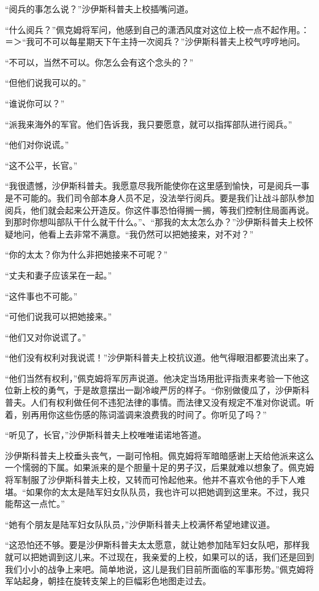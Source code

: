     “阅兵的事怎么说？”沙伊斯科普夫上校插嘴问道。

    “什么阅兵？”佩克姆将军问，他感到自己的潇洒风度对这位上校一点不起作用。：＝＞“我可不可以每星期天下午主持一次阅兵？”沙伊斯科普夫上校气哼哼地问。

    “不可以，当然不可以。你怎么会有这个念头的？”

    “但他们说我可以的。”

    “谁说你可以？”

    “派我来海外的军官。他们告诉我，我只要愿意，就可以指挥部队进行阅兵。”

    “他们对你说谎。”

    “这不公平，长官。”

    “我很遗憾，沙伊斯科普夫。我愿意尽我所能使你在这里感到愉快，可是阅兵一事是不可能的。我们司令部本身人员不足，没法举行阅兵。要是我们让战斗部队参加阅兵，他们就会起来公开造反。你这件事恐怕得搁一搁，等我们控制住局面再说。到那时你想叫部队干什么就干什么。”、“那我的太太怎么办？”沙伊斯科普夫上校怀疑地问，他看上去非常不满意。“我仍然可以把她接来，对不对？”

    “你的太太？你为什么非把她接来不可呢？”

    “丈夫和妻子应该呆在一起。”

    “这件事也不可能。”

    “可他们说我可以把她接来。”

    “他们又对你说谎了。”

    “他们没有权利对我说谎！”沙伊斯科普夫上校抗议道。他气得眼泪都要流出来了。

    “他们当然有权利，”佩克姆将军厉声说道。他决定当场用批评指责来考验一下他这位新上校的勇气，于是故意摆出一副冷峻严厉的样子。“你别做傻瓜了，沙伊斯科普夫。人们有权利做任何不违犯法律的事情。而法律又没有规定不准对你说谎。听着，别再用你这些伤感的陈词滥调来浪费我的时间了。你听见了吗？”

    “听见了，长官，”沙伊斯科普夫上校唯唯诺诺地答道。

    沙伊斯科普夫上校垂头丧气，一副可怜相。佩克姆将军暗暗感谢上天给他派来这么一个懦弱的下属。如果派来的是个胆量十足的男子汉，后果就难以想象了。佩克姆将军制服了沙伊斯科普夫上校，又转而可怜起他来。他并不喜欢令他的手下人难堪。“如果你的太太是陆军妇女队队员，我也许可以把她调到这里来。不过，我只能帮这一点忙。”

    “她有个朋友是陆军妇女队队员，”沙伊斯科普夫上校满怀希望地建议道。

    “这恐怕还不够。要是沙伊斯科普夫太太愿意，就让她参加陆军妇女队吧，那样我就可以把她调到这儿来。不过现在，我亲爱的上校，如果可以的话，我们还是回到我们小小的战争上来吧。简单地说，这儿是我们目前所面临的军事形势。”佩克姆将军站起身，朝挂在旋转支架上的巨幅彩色地图走过去。


